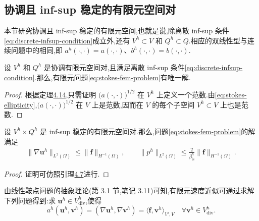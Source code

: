 \subsection{协调且 inf-sup 稳定的有限元空间对}\label{sec:stokes-conforming-stable-pairs}

\begin{note}\label{note:stokes-conforming-stable-spaces}
本节研究协调且 inf-sup 稳定的有限元空间,也就是说,除离散 inf-sup 条件\cref{eq:discrete-infsup-condition}成立外,还有 $V^h\subset V$ 和 $Q^h\subset Q$.相应的双线性型与连续问题中的相同,即 $a^h(\cdot,\cdot)=a(\cdot,\cdot)$、$b^h(\cdot,\cdot)=b(\cdot,\cdot)$.
\end{note}

\begin{corollary}[有限元问题的唯一可解性]\label{cor:stokes-fem-unique-solvability}
设 $V^h$ 和 $Q^h$ 是协调有限元空间对,且满足离散 inf-sup 条件\cref{eq:discrete-infsup-condition}.那么,有限元问题\cref{eq:stokes-fem-problem}有唯一解.
\end{corollary}
\begin{proof}
根据定理\hyperref[thm:stokes-fem-existence]{4.14},只需证明 $\bigl(a(\cdot,\cdot)\bigr)^{1/2}$ 在 $V^h$ 上定义一个范数.由\cref{eq:stokes-ellipticity},$\bigl(a(\cdot,\cdot)\bigr)^{1/2}$ 在 $V$ 上是范数,因而在 $V$ 的每个子空间 $V^h\subset V$ 上也是范数.
\end{proof}

\begin{lemma}[有限元解的稳定性]\label{lem:stokes-fem-stability}
设 $V^h\times Q^h$ 是 inf-sup 稳定的有限元空间对.那么,问题\cref{eq:stokes-fem-problem}的解满足
\[
\begin{aligned}
  \|\nabla\bm{u}^h\|_{L^2(\Omega)}
    \leq\|\bm{f}\|_{H^{-1}(\Omega)},
  \qquad
  \|p^h\|_{L^2(\Omega)}
    \leq\frac{2}{\beta_{\mathrm{is}}^h}
          \|\bm{f}\|_{H^{-1}(\Omega)}.
\end{aligned}
\]
\end{lemma}
\begin{proof}
证明可仿照引理\hyperref[lem:stokes-stability]{4.7}进行.
\end{proof}

\begin{note}[约化为离散散度为零函数空间上的问题]\label{note:stokes-discrete-divergence-free-reduction}
由线性鞍点问题的抽象理论(第 3.1 节,笔记 3.11)可知,有限元速度近似可通过求解下列问题得到:求 $\bm{u}^h\in V_{\mathrm{div}}^h$,使得
\begin{equation}\label{eq:stokes-discrete-divergence-free-formulation}
  a^h(\bm{u}^h,\bm{v}^h)
    =(\nabla\bm{u}^h,\nabla\bm{v}^h)
    =\langle\bm{f},\bm{v}^h\rangle_{V',V}
    \quad\forall\bm{v}^h\in V_{\mathrm{div}}^h.
\end{equation}
\end{note}

